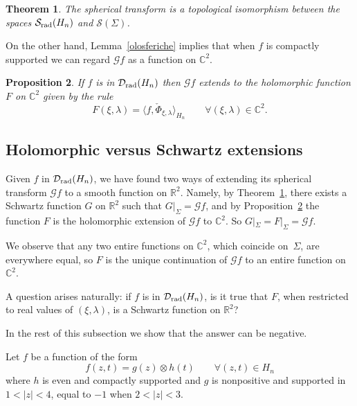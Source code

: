 \documentclass[12pt,a4paper]{amsart}
\theoremstyle{plain}
\newtheorem{theorem}{Theorem}[section]
\newtheorem{proposition}[theorem]{Proposition}
\theoremstyle{definition}
\numberwithin{equation}{section}
\begin{document}
\begin{theorem}\textnormal{\cite[Corollary 1.2]{ADR}} \label{nostro}
The spherical transform is a topological isomorphism between
the spaces ${{\mathcal S}_{\text{\rm rad}}({{H_{n}}})}$
 and ${\mathcal S}({\Sigma})$.
\end{theorem}

On the other hand, Lemma~\ref{olosferiche}
implies that when $f$ is compactly supported
we can regard ${\mathcal G} f$ as a function on ${\mathbb C}^2$.

\begin{proposition}  \label{olomorfia}
If  $f$ is  in ${{\mathcal D}_{\text{\rm rad}}}({{H_{n}}})$ then  ${\mathcal G} f$ extends 
to the  holomorphic function $F$ 
on ${\mathbb C}^2$ given by the rule
$$
F(\xi,{\lambda})={\langle {f},{\check\Phi_{\xi,{\lambda}}} \rangle_{{H_{n}}}}
\qquad\forall (\xi,{\lambda})\in {\mathbb C}^2.
$$
\end{proposition}

\subsection{Holomorphic versus Schwartz extensions}\label{sec:olo}
Given $f$ in ${{\mathcal D}_{\text{\rm rad}}}({{H_{n}}})$, we have found two
ways of extending its spherical transform ${\mathcal G} f$ to a smooth 
function
on ${\mathbb R}^2$. Namely, by Theorem~\ref{nostro}, there exists a Schwartz function
$G$ on ${\mathbb R}^2$ such that $G|_{\Sigma}={\mathcal G} f$, and by Proposition~\ref{olomorfia}
the  function $F$ is the holomorphic extension of ${\mathcal G} f$ to ${\mathbb C}^2$.
So $G|_{\Sigma}=F|_{\Sigma}={\mathcal G} f$.

We observe that any two entire functions on ${\mathbb C}^2$,
which coincide on~${\Sigma}$, 
are everywhere equal, so $F$ is the unique
continuation of ${\mathcal G} f$
to an entire function on ${\mathbb C}^2$. 

A question arises naturally: 
if $f$ is  in ${{\mathcal D}_{\text{\rm rad}}}({{H_{n}}})$, is it true that $F$, 
when restricted to real values of $(\xi,{\lambda})$,  
is a Schwartz function on ${\mathbb R}^2$?

In the rest of this subsection we show that the answer   can be negative.

Let $f$ be a function of the form 
$$
f(z,t)=g(z)\otimes h(t) \qquad \forall (z,t)\in {{H_{n}}}
$$ 
where $h$ is even and
compactly supported
and $g$ is nonpositive and supported in  $1<|z|<4$,  equal to $-1$
when $2<|z|<3$.
\end{document}
